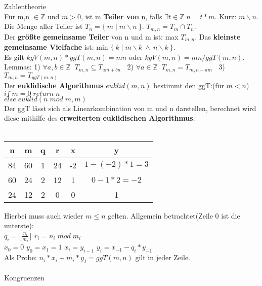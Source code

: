 \documentclass[11pt]{article}
\begin{document}
Zahlentheorie\\
F{\"u}r m,n $\in \mathbb{Z}$ und $m > 0$, ist m {\bfseries Teiler von} n, falls $\exists t\in \mathbb{Z} \; n=t*m$. Kurz: $m\backslash n$.\\
Die Menge aller Teiler ist $T_n = \{\: m \; |\;  m\backslash n \: \}$. $T_{m,n} = T_m \cap T_n$.\\
Der {\bfseries gr{\"o}{\ss}te gemeinsame Teiler} von n und m ist: max $T_{m,n}$. Das {\bfseries kleinste gemeinsame Vielfache} ist: min $\{\: k \; |\; m\backslash k \: \land \: n \backslash k \: \}$.\\
Es gilt $kgV(m,n) * ggT(m,n) = mn$ oder $kgV(m,n) = mn / ggT(m,n)$.\\
Lemmas: 1) $\forall a,b \in \mathbb{Z} \; \; T_{m,n} \subseteq T_{am+bn}\;\;$ 2) $\forall a \in \mathbb{Z} \; \; T_{m,n} = T_{m,n-am}\; \;$ 3) $T_{m,n} = T_{ggT(m,n)}$\\
Der {\bfseries euklidische Algorithmus} $euklid(m,n)$ bestimmt den ggT:(f{\"u}r $m<n$)\\
$if\; m = 0\; return\; n$\\ $else\; euklid(n\; mod\; m, m)$\\
Der ggT l{\"a}sst sich als Linearkombination von m und n darstellen, berechnet wird diese mithilfe des {\bfseries erweiterten euklidischen Algorithmus}:\\ \\
 \begin{tabular}{|c|c|c|c| |c|c|}\hline
  n  & m  & q & r  & x  & y \\ \hline
  84 & 60 & 1 & 24 & -2 & $1 - (-2)*1 = 3$ \\ \hline
  60 & 24 & 2 & 12 & 1  & $0-1*2=-2$ \\ \hline
  24 & 12 & 2 & 0  & 0  & 1 \\ \hline
 \end{tabular}
Hierbei muss auch wieder $m \leq n$ gelten.
Allgemein betrachtet(Zeile 0 ist die unterste):\\ $q_i = \lfloor \frac{n_i}{m_i} \rfloor$ \hspace{5mm} $r_i = n_i\; mod\; m_i$\\
$x_0 = 0$ $y_0 = x_1 = 1$ \hspace{5mm} $x_i = y_{i-1}$ \hspace{5mm} $y_i=x_{-1}-q_i*y_{-1}$ \\ Als Probe: $n_i*x_i+m_i*y_I = ggT(m,n)$ gilt in jeder Zeile.\\\\
Kongruenzen\\
\end{document}
